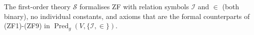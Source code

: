 The first-order theory $\mathcal{S}$ formalises ZF with relation symbols $\mathcal{I}$ and $\in$ (both binary), no individual constants, and axioms that are the formal counterparts of (ZF1)-(ZF9) in $\operatorname{Pred}_g(V, \{\mathcal{I}, \in\})$.
